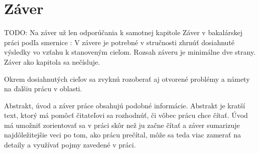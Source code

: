 \chapter*{Záver}  %

TODO: Na záver už len odporúčania k samotnej kapitole Záver v bakalárskej
práci podľa smernice \cite{OttoDIY}:  \glqq{}V závere je potrebné v
stručnosti zhrnúť dosiahnuté výsledky vo vzťahu k stanoveným
cieľom. Rozsah záveru je minimálne dve strany. Záver ako kapitola sa
nečísluje.\grqq{}

Okrem dosiahnutých cieľov sa zvyknú rozoberať aj otvorené problémy a
námety na ďalšiu prácu v oblasti.

Abstrakt, úvod a záver práce obsahujú podobné informácie. Abstrakt je
kratší text, ktorý má pomôcť čitateľovi sa rozhodnúť, či vôbec prácu
chce čítať. Úvod má umožniť zorientovať sa v práci skôr než ju začne
čítať a záver sumarizuje najdôležitejšie veci po tom, ako prácu
prečítal, môže sa teda viac zamerať na detaily a využívať pojmy
zavedené v práci.
